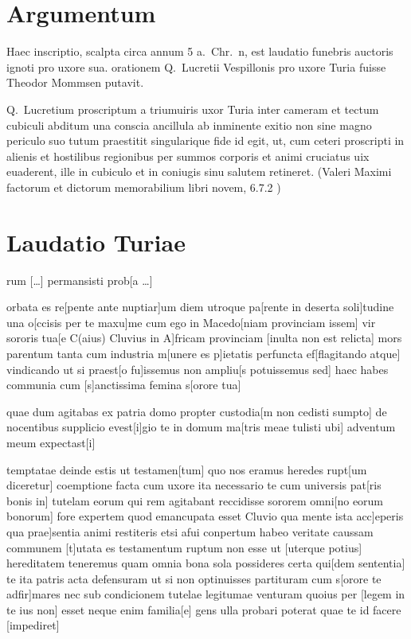 

\section*{Argumentum}

Haec inscriptio, scalpta circa annum 5 a.~Chr.~n, est laudatio funebris auctoris ignoti pro uxore sua. orationem Q.~Lucretii Vespillonis pro uxore Turia fuisse Theodor Mommsen putavit.

Q.\ Lucretium proscriptum a triumuiris uxor Turia inter cameram et tectum cubiculi abditum una conscia ancillula ab inminente exitio non sine magno periculo suo tutum praestitit singularique fide id egit, ut, cum ceteri proscripti in alienis et hostilibus regionibus per summos corporis et animi cruciatus uix euaderent, ille in cubiculo et in coniugis sinu salutem retineret. (Valeri Maximi factorum et dictorum memorabilium libri novem, 6.7.2 )


\section*{Laudatio Turiae}

rum [\dots] permansisti prob[a \dots] 

orbata es re[pente ante nuptiar]um diem utroque pa[rente in deserta soli]tudine una o[ccisis per te maxu]me cum ego in Macedo[niam provinciam issem] vir sororis tua[e C(aius) Cluvius in A]fricam provinciam [inulta non est relicta] mors parentum tanta cum industria m[unere es p]ietatis perfuncta ef[flagitando atque] vindicando ut si praest[o fu]issemus non ampliu[s potuissemus sed] haec habes communia cum [s]anctissima femina s[orore tua] 

quae dum agitabas ex patria domo propter custodia[m non cedisti sumpto] de nocentibus supplicio evest[i]gio te in domum ma[tris meae tulisti ubi] adventum meum expectast[i] 

temptatae deinde estis ut testamen[tum] quo nos eramus heredes rupt[um diceretur] coemptione facta cum uxore ita necessario te cum universis pat[ris bonis in] tutelam eorum qui rem agitabant reccidisse sororem omni[no eorum bonorum] fore expertem quod emancupata esset Cluvio qua mente ista acc]eperis qua prae]sentia animi restiteris etsi afui conpertum habeo veritate caussam communem [t]utata es testamentum ruptum non esse ut [uterque potius] hereditatem teneremus quam omnia bona sola possideres certa qui[dem sententia] te ita patris acta defensuram ut si non optinuisses partituram cum s[orore te adfir]mares nec sub condicionem tutelae legitumae venturam quoius per [legem in te ius non] esset neque enim familia[e] gens ulla probari poterat quae te id facere [impediret] 

